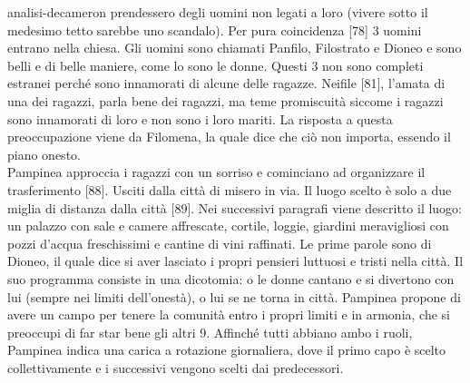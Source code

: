 \documentclass[preview]{standalone}
\begin{document}
\begin{snippet}{analisi-decameron}
    prendessero degli uomini non legati a loro (vivere sotto il medesimo tetto sarebbe uno scandalo).
    Per pura coincidenza [78] 3 uomini entrano nella chiesa. Gli uomini sono chiamati Panfilo, Filostrato e Dioneo
    e sono belli e di belle maniere, come lo sono le donne.
    Questi 3 non sono completi estranei perché sono innamorati di alcune delle ragazze.
    Neifile [81], l'amata di una dei ragazzi, parla bene dei ragazzi, ma teme
    promiscuità siccome i ragazzi sono innamorati di loro e non sono i loro mariti.
    La risposta a questa preoccupazione viene da Filomena, la quale dice che ciò non importa,
    essendo il piano onesto. \\
    Pampinea approccia i ragazzi con un sorriso e cominciano ad organizzare il trasferimento [88].
    Usciti dalla città di misero in via. Il luogo scelto è solo a due miglia di distanza dalla città [89].
    Nei successivi paragrafi viene descritto il luogo: un palazzo con sale e camere affrescate, cortile, loggie,
    giardini meravigliosi con pozzi d'acqua freschissimi e cantine di vini raffinati.
    Le prime parole sono di Dioneo, il quale dice si aver lasciato i propri pensieri luttuosi e tristi nella città.
    Il suo programma consiste in una dicotomia: o le donne cantano e si divertono con lui
    (sempre nei limiti dell'onestà), o lui se ne torna in città.
    Pampinea propone di avere un campo per tenere la comunità entro i propri limiti e in armonia,
    che si preoccupi di far star bene gli altri 9.
    Affinché tutti abbiano ambo i ruoli, Pampinea indica una carica a rotazione giornaliera,
    dove il primo capo è scelto collettivamente e i successivi vengono scelti dai predecessori.
\end{snippet}
\end{document}
